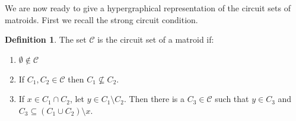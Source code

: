 \documentclass[11pt]{article}
\newcommand{\sanote}{\todo[color=violet!30]}
\newcommand{\sC}{\mathscr{C}}
\newtheorem{lem}[thm]{Lemma}
\theoremstyle{remark}
\theoremstyle{definition}
\newtheorem{dfn}[thm]{Definition}
\begin{document}
We are now ready to give a hypergraphical representation of the circuit sets of matroids. First we recall the strong circuit condition.

\begin{dfn}
    The set $\sC$ is the circuit set of a matroid if:
    \begin{enumerate}
    \item $\emptyset \not \in \sC$
    \item If $C_1, C_2 \in \sC$ then $C_1 \not \subseteq C_2$.
    \item If $x \in C_1 \cap C_2$, let $y \in C_1 \setminus C_2$. Then there is a $C_3 \in \sC$ such that $y \in C_3$ and $C_3 \subseteq (C_1 \cup C_2) \setminus x$.
    \end{enumerate}
\end{dfn}

\begin{comment}show an that the third circuit, whose existence is demanded by the circuit condition, \eqref{eq:circuitcondition},, must contain the symmetric difference of the two initial circuits.

\begin{lem}\label{res:symdiffcontained}
Let $M = (V, \sC)$. Then, for $x \in C_1 \cap C_2$ and $C_3 \subseteq C_1 \cup C_2 \setminus x$, $C_3$ contains the symmetric difference of $C_1$ and $C_2$: $C_3 \supseteq (C_1 \cup C_2) \setminus (C_1 \cap C_2)$.
\end{lem} \sanote{this is not correct. See strong circuit cond}
\begin{proof}
Suppose that $C_3 \supseteq (C_1 \cup C_2) \setminus (C_1 \cap C_2)$ does not hold. Since $C_3 \subseteq C_1 \cup C_2 \setminus x$, this implies that $C_3 \subsetneq (C_1 \cup C_2) \setminus (C_1 \cap C_2)$. I.e. there is an element $a \in C_2\setminus C_1$ such that $a \not \in C_3$. 

Since $C_3 \not \subseteq C_2$,  $|(C_1 \setminus C_2)\cap C_3| = n_3$ with $y_3 \in C_1 \cap C_3$ Note that $C_2 \not \subseteq C_1 \cap C_3 \setminus y_3$. Therefore, by the circuit condition, \eqref{eq:circuitcondition}, there is a $C_4 \subseteq C_3 \cap C_2 \setminus y_3$. If $n_3 = 1$ then $C_4 \subsetneq C_2$, which is a contradiction.

If $n >1$, $|(C_1 \setminus C_2)\cap C_4|  = n_4 < n_3$. Let $y_4 \in C_3 \cap C_4$, and $C_5 \subseteq C_3 \cap C_4 \setminus y_4$. If $m = i$, then $C_5 \subsetneq C_2$, which is a contradiction. Otherwise, continue applying the circuit condition, \eqref{eq:circuitcondition}, to get $C_{i+1} \subseteq C_3 \cup C_i \setminus y_i$ with $|(C_1 \setminus C_2)\cap C_i|  = n_{i+1} < n_i$. This will yeild $n_k = 1$ for some $k$, forcing $C_{k+1} \subsetneq C_2$ which is a contradiction. 
\end{proof} \end{comment}
\end{document}
